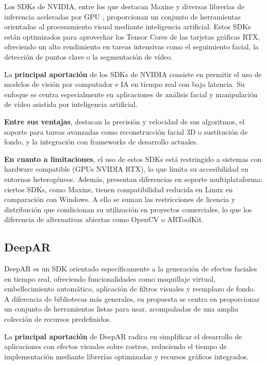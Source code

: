 Los SDKs de NVIDIA, entre los que destacan Maxine y diversas librerías de inferencia aceleradas por GPU \citep{SDK_NVIDIA}, proporcionan un conjunto de herramientas orientadas al procesamiento visual mediante inteligencia artificial. Estos SDKs están optimizados para aprovechar los Tensor Cores de las tarjetas gráficas RTX, ofreciendo un alto rendimiento en tareas intensivas como el seguimiento facial, la detección de puntos clave o la segmentación de vídeo.

La \textbf{principal aportación} de los SDKs de NVIDIA consiste en permitir el uso de modelos de visión por computador e IA en tiempo real con baja latencia. Su enfoque se centra especialmente en aplicaciones de análisis facial y manipulación de vídeo asistida por inteligencia artificial.

\textbf{Entre sus ventajas}, destacan la precisión y velocidad de sus algoritmos, el soporte para tareas avanzadas como reconstrucción facial 3D o sustitución de fondo, y la integración con frameworks de desarrollo actuales.

\textbf{En cuanto a limitaciones}, el uso de estos SDKs está restringido a sistemas con hardware compatible (GPUs NVIDIA RTX), lo que limita su accesibilidad en entornos heterogéneos. Además, presentan diferencias en soporte multiplataforma: ciertos SDKs, como Maxine, tienen compatibilidad reducida en Linux en comparación con Windows. A ello se suman las restricciones de licencia y distribución que condicionan su utilización en proyectos comerciales, lo que los diferencia de alternativas abiertas como OpenCV o ARToolKit.

\subsection{DeepAR}
\label{subsec:deepar}

DeepAR \citep{DeepAR} es un SDK orientado específicamente a la generación de efectos faciales en tiempo real, ofreciendo funcionalidades como maquillaje virtual, embellecimiento automático, aplicación de filtros visuales y reemplazo de fondo. A diferencia de bibliotecas más generales, su propuesta se centra en proporcionar un conjunto de herramientas listas para usar, acompañadas de una amplia colección de recursos predefinidos.

La \textbf{principal aportación} de DeepAR radica en simplificar el desarrollo de aplicaciones con efectos visuales sobre rostros, reduciendo el tiempo de implementación mediante librerías optimizadas y recursos gráficos integrados.


